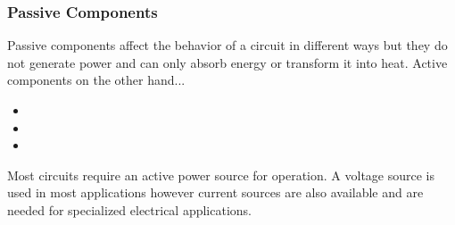 \documentclass[fleqn]{beamer} %
\newcommand{\sectionIsubsectionItitle}{Passive Components}
\begin{document}
			\begin{frame}
				\frametitle{\sectionIsubsectionItitle}
				
				Passive components affect the behavior of a circuit in different ways but they do   not generate power and can only absorb energy or transform it into heat. Active components on the other hand...

				\begin{itemize}
				\item 
				\item
				\item
				\end{itemize}

				Most circuits require an active power source for operation. A voltage source is used in most applications however current sources are also available and are needed for specialized electrical applications. 

			\end{frame}
\end{document}

